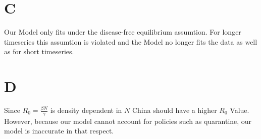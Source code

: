 \documentclass{article}
\begin{document}
\section*{C}

Our Model only fits under the disease-free equilibrium assumtion. For longer timeseries this assumtion is violated and the Model no longer fits the data as well as for short timeseries.

\section*{D}

Since $R_0 = \frac{\beta N}{\gamma}$ is density dependent in $N$ China should have a higher $R_0$ Value. However, because our model cannot account for policies such as quarantine, our model is inaccurate in that respect.
\end{document}
